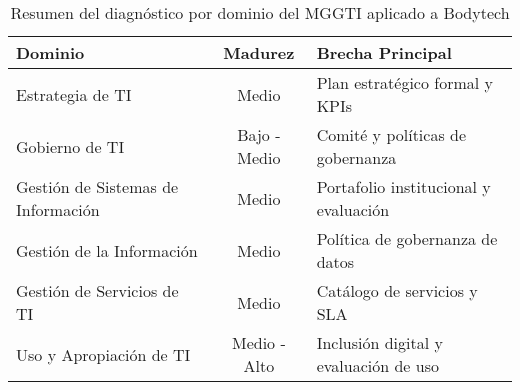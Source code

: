 \begin{table}[H]
  \centering
  \begin{tabular}{|p{5cm}|c|p{7cm}|}
    \hline
    \textbf{Dominio} & \textbf{Madurez} & \textbf{Brecha Principal} \\
    \hline
    Estrategia de TI & Medio & Plan estratégico formal y KPIs \\
    \hline
    Gobierno de TI & Bajo - Medio & Comité y políticas de gobernanza \\
    \hline
    Gestión de Sistemas de Información & Medio & Portafolio institucional y evaluación \\
    \hline
    Gestión de la Información & Medio & Política de gobernanza de datos \\
    \hline
    Gestión de Servicios de TI & Medio & Catálogo de servicios y SLA \\
    \hline
    Uso y Apropiación de TI & Medio - Alto & Inclusión digital y evaluación de uso \\
    \hline
  \end{tabular}
  \caption{Resumen del diagnóstico por dominio del MGGTI aplicado a Bodytech}
\end{table}
